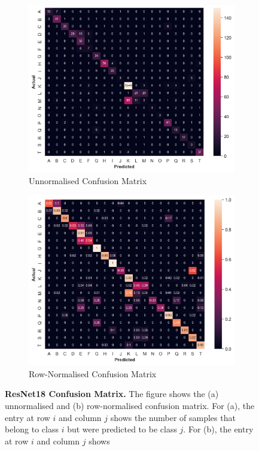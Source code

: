 \documentclass[a4paper]{article}
\begin{document}
  \begin{figure}[ht]
    \centering
    \begin{subfigure}[b]{0.49\textwidth}
      \includegraphics[width=\textwidth]{figures/experiment1-conf-matrix-resnet18.png}
      \caption{Unnormalised Confusion Matrix}
    \end{subfigure}
    \begin{subfigure}[b]{0.49\textwidth}
      \includegraphics[width=\textwidth]{figures/experiment1-recall-matrix-resnet18.png}
      \caption{Row-Normalised Confusion Matrix}
    \end{subfigure}
    \caption{
      \textbf{ResNet18 Confusion Matrix.} The figure shows the (a) unnormalised
      and (b) row-normalised confusion matrix. For (a), the entry at row $i$ and
      column $j$ shows the number of samples that belong to class $i$ but were
      predicted to be class $j$. For (b), the entry at row $i$ and column $j$
      shows}
    \label{fig:resnet18-confusion-matrix}
  \end{figure}
  
\end{document}
